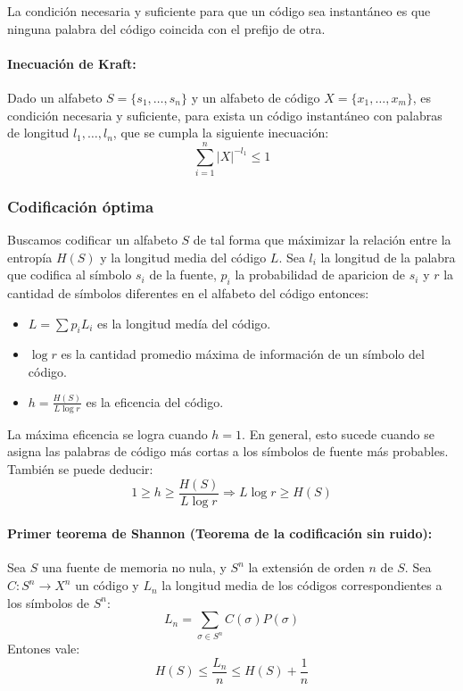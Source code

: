 La condición necesaria y suficiente para que un código sea instantáneo es que ninguna palabra del código coincida con el prefijo de otra.

\paragraph{Inecuación de Kraft:} Dado un alfabeto \(S = \{s_1,\dots,s_n\}\) y un alfabeto de código \(X=\{x_1,\dots,x_m\}\), es condición necesaria y suficiente, para exista un código instantáneo con palabras de longitud \(l_1,\dots,l_{n}\), que se cumpla la siguiente inecuación:
\[\sum_{i=1}^n |X|^{-l_1}\leq 1\]

\subsubsection{Codificación óptima}
Buscamos codificar un alfabeto \(S\) de tal forma que máximizar la relación entre la entropía \(H(S)\) y la longitud media del código \(L\).  Sea \(l_i\) la longitud de la palabra que codifica al símbolo \(s_i\) de la fuente, \(p_i\) la probabilidad de aparicion de \(s_i\) y \(r\) la cantidad de símbolos diferentes en el alfabeto del código entonces:

\begin{itemize}
  \item \(L = \sum p_iL_i \) es la longitud medía del código.
  \item \(\log r\) es la cantidad promedio máxima de información de un símbolo del código.
  \item \(h = \frac{H(S)}{L\log r}\) es la eficencia del código.
\end{itemize}

La máxima eficencia se logra cuando \(h = 1\). En general, esto sucede cuando se asigna las palabras de código más cortas a los símbolos de fuente más probables. También se puede deducir: \[1 \geq h \geq \frac{H(S)}{L\log r}\Rightarrow L\log r \geq H(S)\]

\paragraph{Primer teorema de Shannon (Teorema de la codificación sin ruido):} Sea \(S\) una fuente de memoria no nula, y \(S^n\) la extensión de orden \(n\) de \(S\).  Sea \(C:S^n\to X^n\) un código y \(L_n\) la longitud media de los códigos correspondientes a los símbolos de \(S^n\):
\[
    L_n = \sum_{\sigma\in S^n} C(\sigma)P(\sigma)
\]
Entones vale:
\[
    H(S) \leq \frac{L_n}{n} \leq H(S) + \frac{1}{n}
\]

